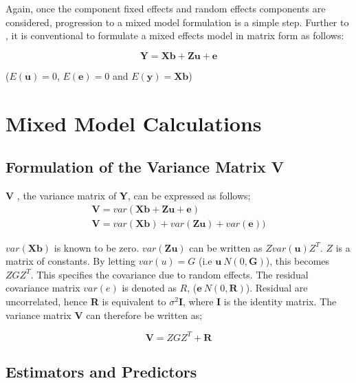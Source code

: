 \documentclass[12pt, a4paper]{report}
\begin{document}
Again, once the component fixed effects and random effects
components are considered, progression to a mixed model
formulation is a simple step. Further to \citet{lw82}, it is
conventional to formulate a mixed effects model in matrix form as
follows:

\begin{equation}
\textbf{Y} = \textbf{Xb} + \textbf{Zu} + \textbf{e}
\end{equation}

($E(\textbf{u})=0$, $E(\textbf{e})=0 $ and $E(\textbf{y}) =
\textbf{Xb}$)

\section{Mixed Model Calculations}
\subsection{Formulation of the Variance Matrix V}
\textbf{V} , the variance matrix of \textbf{Y}, can be expressed
as follows;
\begin{eqnarray}
\textbf{V}= var ( \textbf{Xb} + \textbf{Zu} + \textbf{e})\\
\textbf{V}= var ( \textbf{Xb} ) + var (\textbf{Zu}) +
var(\textbf{e}))
\end{eqnarray}


$var(\textbf{Xb})$ is known to be zero. $var(\textbf{Zu})$ can be
written as $Zvar(\textbf{u})Z^{T}$. $Z$ is a matrix of constants.
By letting $var(u) = G$ (i.e $\textbf{u} ~ N(0,\textbf{G})$), this
becomes $ZGZ^{T}$. This specifies the covariance due to random
effects. The residual covariance matrix $var(e)$ is denoted as
$R$, ($\textbf{e} ~ N(0,\textbf{R})$). Residual are uncorrelated,
hence \textbf{R} is equivalent to $\sigma^{2}$\textbf{I}, where
\textbf{I} is the identity matrix. The variance matrix \textbf{V}
can therefore be written as;

\begin{equation}
\textbf{V}  = ZGZ^{T} + \textbf{R}
\end{equation}

\subsection{Estimators and Predictors}
\end{document}
